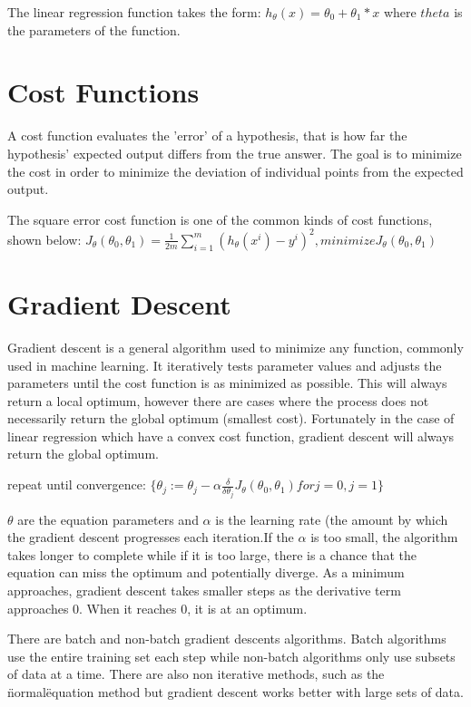 \documentclass[12pt, twoside, a4paper]{book}
\begin{document}
The linear regression function takes the form: $h_\theta(x)=\theta_0 + \theta_1 * x$ where $theta$ is the parameters of the function.


\section{Cost Functions}
A cost function evaluates the 'error' of a hypothesis, that is how far the hypothesis' expected output differs from the true answer. The goal is to minimize the cost in order to minimize the deviation of individual points from the expected output.

The square error cost function is one of the common kinds of cost functions, shown below:\newline
$J_\theta(\theta_0,\theta_1) = \frac{1}{2m}\sum\limits_{i=1}^m (h_\theta(x^i)-y^i)^2, minimize J_\theta(\theta_0,\theta_1)$

\section{Gradient Descent}
Gradient descent is a general algorithm used to minimize any function, commonly used in machine learning. It iteratively tests parameter values and adjusts the parameters until the cost function is as minimized as possible.
This will always return a local optimum, however there are cases where the  process does not necessarily return the global optimum (smallest cost). Fortunately in the case of linear regression which have a convex cost function, gradient descent will always return the global optimum.

repeat until convergence: $\{\theta_j := \theta_j - \alpha\frac{\delta}{\delta\theta_j}J_\theta(\theta_0,\theta_1) for j=0,j=1\}$

$\theta$ are the equation parameters and $\alpha$ is the learning rate (the amount by which the gradient descent progresses each iteration.If the $\alpha$ is too small, the algorithm takes longer to complete while if it is too large, there is a chance that the equation can miss the optimum and potentially diverge. As a minimum approaches, gradient descent takes smaller steps as the derivative term approaches 0. When it reaches 0, it is at an optimum.

There are batch and non-batch gradient descents algorithms. Batch algorithms use the entire training set each step while non-batch algorithms only use subsets of data at a time. There are also non iterative methods, such as the \"normal\" equation method but gradient descent works better with large sets of data.
\end{document}
